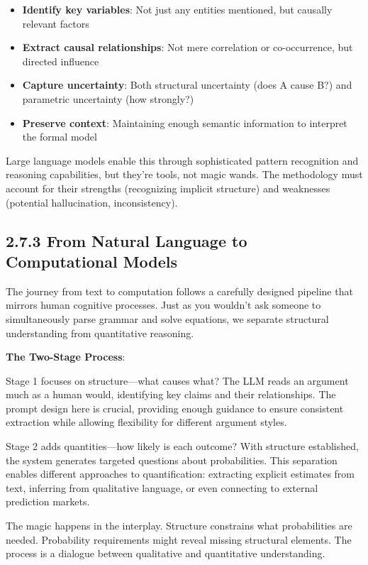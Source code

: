 \documentclass[
  11pt,
  letterpaper,
  openany]{book}
\providecommand{\tightlist}{%
  \setlength{\itemsep}{0pt}\setlength{\parskip}{0pt}}
\begin{document}
\begin{itemize}
\tightlist
\item
  \textbf{Identify key variables}: Not just any entities mentioned, but
  causally relevant factors
\item
  \textbf{Extract causal relationships}: Not mere correlation or
  co-occurrence, but directed influence
\item
  \textbf{Capture uncertainty}: Both structural uncertainty (does A
  cause B?) and parametric uncertainty (how strongly?)
\item
  \textbf{Preserve context}: Maintaining enough semantic information to
  interpret the formal model
\end{itemize}

Large language models enable this through sophisticated pattern
recognition and reasoning capabilities, but they're tools, not magic
wands. The methodology must account for their strengths (recognizing
implicit structure) and weaknesses (potential hallucination,
inconsistency).

\subsection{2.7.3 From Natural Language to Computational
Models}\label{sec-natural-to-computational}

The journey from text to computation follows a carefully designed
pipeline that mirrors human cognitive processes. Just as you wouldn't
ask someone to simultaneously parse grammar and solve equations, we
separate structural understanding from quantitative reasoning.

\textbf{The Two-Stage Process}:

Stage 1 focuses on structure---what causes what? The LLM reads an
argument much as a human would, identifying key claims and their
relationships. The prompt design here is crucial, providing enough
guidance to ensure consistent extraction while allowing flexibility for
different argument styles.

Stage 2 adds quantities---how likely is each outcome? With structure
established, the system generates targeted questions about
probabilities. This separation enables different approaches to
quantification: extracting explicit estimates from text, inferring from
qualitative language, or even connecting to external prediction markets.

The magic happens in the interplay. Structure constrains what
probabilities are needed. Probability requirements might reveal missing
structural elements. The process is a dialogue between qualitative and
quantitative understanding.
\end{document}
